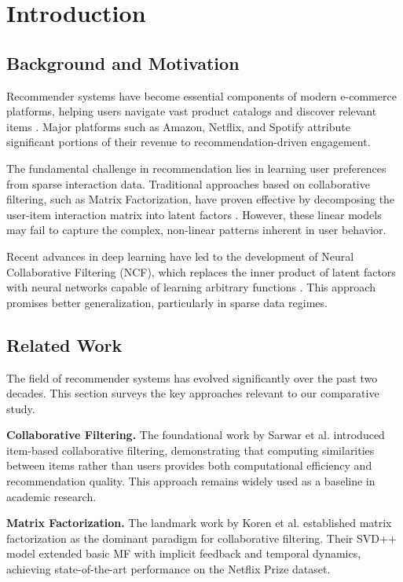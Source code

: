 %
%
\chapter{Introduction}
\label{chap:intro}
\setlength{\parskip}{1em}

\section{Background and Motivation}

Recommender systems have become essential components of modern e-commerce platforms, helping users navigate vast product catalogs and discover relevant items \cite{ricci2011introduction}. Major platforms such as Amazon, Netflix, and Spotify attribute significant portions of their revenue to recommendation-driven engagement.

The fundamental challenge in recommendation lies in learning user preferences from sparse interaction data. Traditional approaches based on collaborative filtering, such as Matrix Factorization, have proven effective by decomposing the user-item interaction matrix into latent factors \cite{koren2009matrix}. However, these linear models may fail to capture the complex, non-linear patterns inherent in user behavior.

Recent advances in deep learning have led to the development of Neural Collaborative Filtering (NCF), which replaces the inner product of latent factors with neural networks capable of learning arbitrary functions \cite{he2017neural}. This approach promises better generalization, particularly in sparse data regimes.

\section{Related Work}

The field of recommender systems has evolved significantly over the past two decades. This section surveys the key approaches relevant to our comparative study.

\textbf{Collaborative Filtering.} The foundational work by Sarwar et al. \cite{sarwar2001item} introduced item-based collaborative filtering, demonstrating that computing similarities between items rather than users provides both computational efficiency and recommendation quality. This approach remains widely used as a baseline in academic research.

\textbf{Matrix Factorization.} The landmark work by Koren et al. \cite{koren2009matrix} established matrix factorization as the dominant paradigm for collaborative filtering. Their SVD++ model extended basic MF with implicit feedback and temporal dynamics, achieving state-of-the-art performance on the Netflix Prize dataset.


